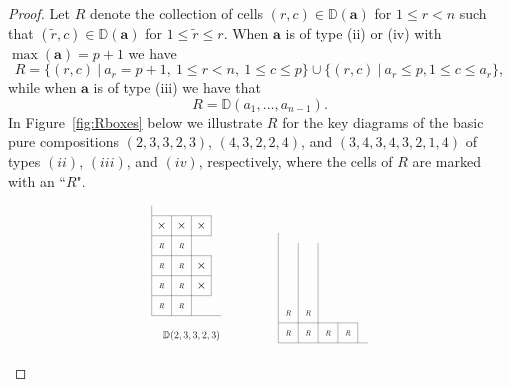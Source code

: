 \documentclass[letterpaper,10pt]{article}
\begin{document}
\begin{proof}
    Let $R$ denote the collection of cells $(r,c)\in\mathbb{D}(\mathbf{a})$ for $1\le r<n$ such that $(\tilde{r},c)\in\mathbb{D}(\mathbf{a})$ for $1\le \tilde{r}\le r$. When $\mathbf{a}$ is of type (ii) or (iv) with $\max(\mathbf{a})=p+1$ we have 
    \begin{equation}\label{eq:1}
        R=\{(r,c)~|~a_r=p+1,~1\le r<n,~1\le c\le p\}\cup \{(r,c)~|~a_r\le p,1\le c\le a_r\},
    \end{equation}
    while when $\mathbf{a}$ is of type (iii) we have that 
    \begin{equation}\label{eq:2}
        R=\mathbb{D}(a_1,\hdots,a_{n-1}).
    \end{equation}
    In Figure~\ref{fig:Rboxes} below we illustrate $R$ for the key diagrams of the basic pure compositions $(2,3,3,2,3)$, $(4,3,2,2,4)$, and $(3,4,3,4,3,2,1,4)$ of types $(ii)$, $(iii)$, and $(iv)$, respectively, where the cells of $R$ are marked with an ``$R$".
    \begin{figure}[H]
        \centering
        $$\scalebox{0.5}{\begin{tikzpicture}
            \draw (0,5.5)--(0,0)--(3.5,0);
            \node at (0.5,0.5) {$R$};
            \node at (1.5,0.5) {$R$};
            \draw (0,1)--(2,1)--(2,0);
            \draw (1,0)--(1,5);
            \node at (0.5,1.5) {$R$};
            \node at (1.5,1.5) {$R$};
            \node at (2.5,1.5) {$\bigtimes$};
            \draw (0,2)--(3,2)--(3,1)--(2,1);
            \draw (2,1)--(2,5);
            \node at (0.5,2.5) {$R$};
            \node at (1.5,2.5) {$R$};
            \node at (2.5,2.5) {$\bigtimes$};
            \draw (0,3)--(3,3)--(3,2);
            \node at (0.5,3.5) {$R$};
            \node at (1.5,3.5) {$R$};
            \draw (0,4)--(2,4);
            \node at (0.5,4.5) {$\bigtimes$};
            \node at (1.5,4.5) {$\bigtimes$};
            \node at (2.5,4.5) {$\bigtimes$};
            \draw (0,5)--(3,5)--(3,4)--(2,4);
            \node at (2,-1) {\Large $\mathbb{D}(2,3,3,2,3)$};
        \end{tikzpicture}}\quad\quad\quad\quad \scalebox{0.5}{\begin{tikzpicture}
            \draw (0,5.5)--(0,0)--(4.5,0);
            \node at (0.5,0.5) {$R$};
            \node at (1.5,0.5) {$R$};
            \node at (2.5,0.5) {$R$};
            \node at (3.5,0.5) {$R$};
            \draw (0,1)--(4,1)--(4,0);
            \draw (1,0)--(1,5);
            \draw (2,0)--(2,5);
            \draw (3,0)--(3,1);
            \node at (0.5,1.5) {$R$};
            \node at (1.5,1.5) {$R$};

\end{tikzpicture}}$$
\end{figure}
\end{proof}
\end{document}
